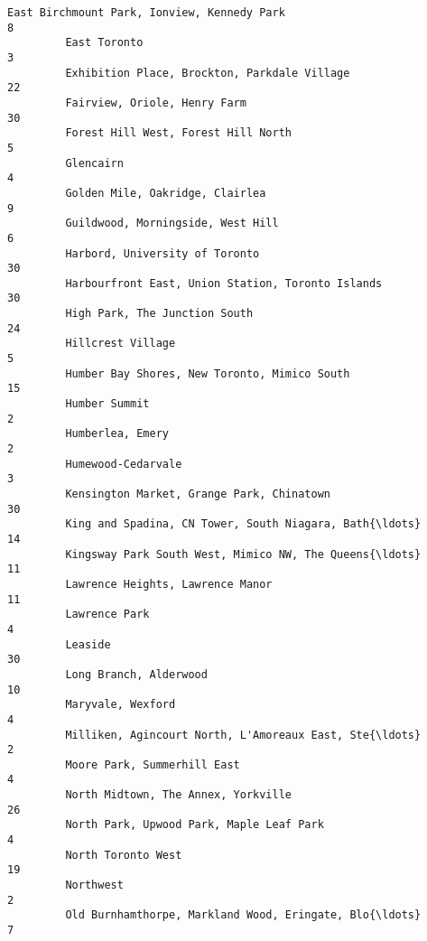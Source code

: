\documentclass[11pt]{article}
\begin{document}
\begin{Verbatim}[commandchars=\\\{\}]
         East Birchmount Park, Ionview, Kennedy Park                             8   
         East Toronto                                                            3   
         Exhibition Place, Brockton, Parkdale Village                           22   
         Fairview, Oriole, Henry Farm                                           30   
         Forest Hill West, Forest Hill North                                     5   
         Glencairn                                                               4   
         Golden Mile, Oakridge, Clairlea                                         9   
         Guildwood, Morningside, West Hill                                       6   
         Harbord, University of Toronto                                         30   
         Harbourfront East, Union Station, Toronto Islands                      30   
         High Park, The Junction South                                          24   
         Hillcrest Village                                                       5   
         Humber Bay Shores, New Toronto, Mimico South                           15   
         Humber Summit                                                           2   
         Humberlea, Emery                                                        2   
         Humewood-Cedarvale                                                      3   
         Kensington Market, Grange Park, Chinatown                              30   
         King and Spadina, CN Tower, South Niagara, Bath{\ldots}                     14   
         Kingsway Park South West, Mimico NW, The Queens{\ldots}                     11   
         Lawrence Heights, Lawrence Manor                                       11   
         Lawrence Park                                                           4   
         Leaside                                                                30   
         Long Branch, Alderwood                                                 10   
         Maryvale, Wexford                                                       4   
         Milliken, Agincourt North, L'Amoreaux East, Ste{\ldots}                      2   
         Moore Park, Summerhill East                                             4   
         North Midtown, The Annex, Yorkville                                    26   
         North Park, Upwood Park, Maple Leaf Park                                4   
         North Toronto West                                                     19   
         Northwest                                                               2   
         Old Burnhamthorpe, Markland Wood, Eringate, Blo{\ldots}                      7   

\end{Verbatim}
\end{document}
